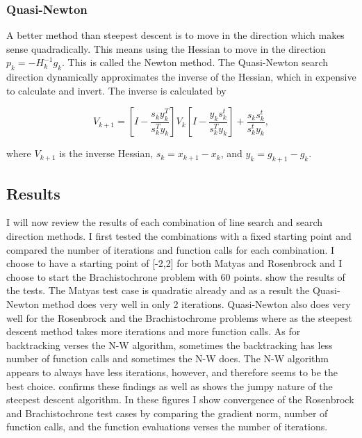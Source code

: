 \documentclass{article}
\begin{document}
\subsubsection*{Quasi-Newton}

A better method than steepest descent is to move in the direction which makes sense quadradically. This means using the Hessian to move in the direction $p_k=-H_k^{-1}g_k$. This is called the Newton method. The Quasi-Newton search direction dynamically approximates the inverse of the Hessian, which in expensive to calculate and invert. The inverse is calculated by

$$V_{k+1} = [I-\frac{s_k y_k^T}{s_k^T y_k}] V_k [I- \frac{y_k s_k^t}{s_k^T y_k}] + \frac{s_k s_k^t}{s_k^t y_k},$$

where $V_{k+1}$ is the inverse Hessian, $s_k = x_{k+1}-x_k$, and $y_k = g_{k+1}-g_k$.




\subsection*{Results}

I will now review the results of each combination of line search and search direction methods. I first tested the combinations with a fixed starting point and compared the number of iterations and function calls for each combination. I choose to have a starting point of [-2,2] for both Matyas and Rosenbrock and I choose to start the Brachistochrone problem with 60 points.  show the results of the tests. The Matyas test case is quadratic already and as a result the Quasi-Newton method does very well in only 2 iterations. Quasi-Newton also does very well for the Rosenbrock and the Brachistochrome problems where as the steepest descent method takes more iterations and more function calls. As for backtracking verses the N-W algorithm, sometimes the backtracking has less number of function calls and sometimes the N-W does. The N-W algorithm appears to always have less iterations, however, and therefore seems to be the best choice.  confirms these findings as well as shows the jumpy nature of the steepest descent algorithm. In these figures I show convergence of the Rosenbrock and Brachistochrone test cases by comparing the gradient norm, number of function calls, and the function evaluations verses the number of iterations. 
\end{document}
